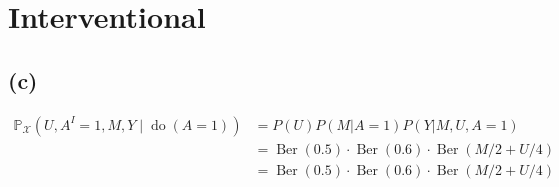 \documentclass[10pt]{article}
\begin{document}



\section{Interventional}
\subsection{(c)}

\begin{align*}
\mathbb{P}_{\mathcal{X}}(U, A^I=1, M, Y \mid \operatorname{do}(A=1)) &=  P(U)P(M|A=1)P(Y|M, U, A=1)\\
&= \operatorname{Ber}(0.5)\cdot\operatorname{Ber}(0.6)\cdot\operatorname{Ber}(M/2 + U/4)\\
&= \operatorname{Ber}(0.5)\cdot\operatorname{Ber}(0.6)\cdot\operatorname{Ber}(M/2 + U/4)
\end{align*}    
\end{document}
